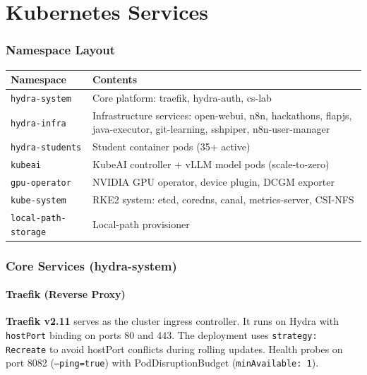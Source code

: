 \documentclass[11pt,a4paper]{article}
\begin{document}
\newpage
\part{Kubernetes Services}

\section{Namespace Layout}

\begin{table}[H]
\centering
\begin{tabular}{lp{8cm}}
\toprule
\textbf{Namespace} & \textbf{Contents} \\
\midrule
\texttt{hydra-system} & Core platform: traefik, hydra-auth, cs-lab \\
\texttt{hydra-infra} & Infrastructure services: open-webui, n8n, hackathons, flapjs, java-executor, git-learning, sshpiper, n8n-user-manager \\
\texttt{hydra-students} & Student container pods (35+ active) \\
\texttt{kubeai} & KubeAI controller + vLLM model pods (scale-to-zero) \\
\texttt{gpu-operator} & NVIDIA GPU operator, device plugin, DCGM exporter \\
\texttt{kube-system} & RKE2 system: etcd, coredns, canal, metrics-server, CSI-NFS \\
\texttt{local-path-storage} & Local-path provisioner \\
\bottomrule
\end{tabular}
\end{table}

\section{Core Services (hydra-system)}

\subsection{Traefik (Reverse Proxy)}

\begin{infobox}
\textbf{Traefik v2.11} serves as the cluster ingress controller. It runs on Hydra with \texttt{hostPort} binding on ports 80 and 443. The deployment uses \texttt{strategy: Recreate} to avoid hostPort conflicts during rolling updates. Health probes on port 8082 (\texttt{--ping=true}) with PodDisruptionBudget (\texttt{minAvailable: 1}).
\end{infobox}
\end{document}
